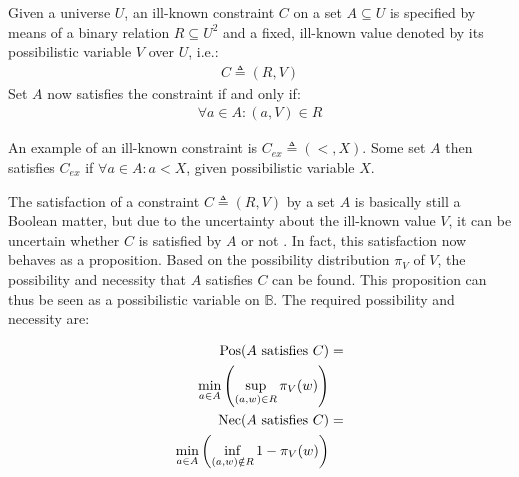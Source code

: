 \begin{definition}
Given a universe $U$, an ill-known constraint $C$ on a set $A \subseteq U$ is specified by means of a binary relation $R \subseteq U^{2}$ and a fixed, ill-known value denoted by its possibilistic variable $V$ over $U$, i.e.:
\begin{align}
\label{eq:ill-known-constraint}
C \triangleq (R,V)
\end{align}
Set $A$ now satisfies the constraint if and only if:
\begin{align}
\forall a \in A : (a,V) \in R
\end{align}
\end{definition}

An example of an ill-known constraint is $C_{ex} \triangleq (<, X)$. Some set $A$ then satisfies $C_{ex}$ if $\forall a \in A : a < X$, given possibilistic variable $X$.

The satisfaction of a constraint $C \triangleq (R,V)$ by a set $A$ is basically still a Boolean matter, but due to the uncertainty about the ill-known value $V$, it can be uncertain whether $C$ is satisfied by $A$ or not \cite{Pons2011}. In fact, this satisfaction now behaves as a proposition. Based on the possibility distribution $\pi_{V}$ of $V$, the possibility and necessity that $A$ satisfies $C$ can be found. This proposition can thus be seen as a possibilistic variable on $\mathbb{B}$. The required possibility and necessity are:

\vspace{-10pt}

\begin{align}
\operatorname{Pos}(A\text{ satisfies }C) & =\\
\nonumber
\min_{a \in A}\left(\sup_{(a,w) \in R}\pi_{V}(w)\right) \label{ill-known-pos}\\
\operatorname{Nec}(A\text{ satisfies }C) & =\\
\nonumber
\min_{a \in A}\left(\inf_{(a,w) \notin R} 1-\pi_{V}(w)\right) \label{ill-known-nec}
\end{align}

